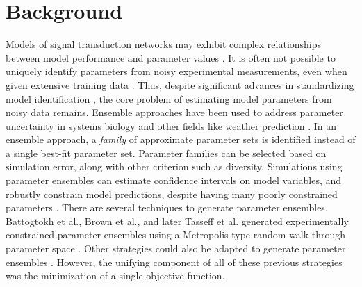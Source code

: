 \documentclass{bmcart}
\begin{document}


\section*{Background}
Models of signal transduction networks may exhibit complex relationships between model performance and parameter values \cite{Brown:2004}.
It is often not possible to uniquely identify parameters from noisy experimental measurements, even when given extensive training data \cite{Gadkar:2005ad}.
Thus, despite significant advances in standardizing model identification \cite{Gennemark:2009on},
the core problem of estimating model parameters from noisy data remains.
Ensemble approaches have been used to address parameter uncertainty in systems biology and other fields like weather prediction \cite{Battogtokh:2002,Kuepfer:2007, Brown:2003,Palmer:2005}.
In an ensemble approach, a \emph{family} of approximate parameter sets is identified instead of a single best-fit parameter set.
Parameter families can be selected based on simulation error, along with other criterion such as diversity.
Simulations using parameter ensembles can estimate confidence intervals on model variables, and robustly constrain model predictions,
despite having many poorly constrained parameters \cite{Gutenkunst2007,Song:2009b}.
There are several techniques to generate parameter ensembles.
Battogtokh et al., Brown et al., and later Tasseff et al. generated experimentally constrained parameter ensembles using a
Metropolis-type random walk through parameter space \cite{Battogtokh:2002,Brown:2003,Tasseff:2010aa,Tasseff:2011aa}.
Other strategies could also be adapted to generate parameter ensembles \cite{Moles:2003}.
However, the unifying component of all of these previous strategies was the minimization of a single objective function.
\end{document}
